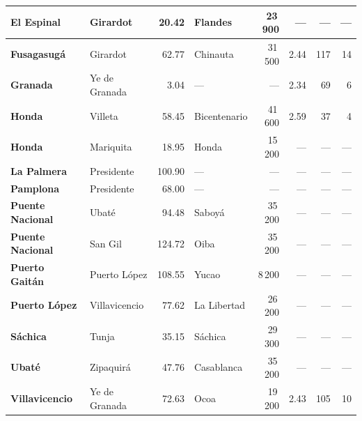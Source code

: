 \begin{longtable}{|l|l|r|l|r|r|r|r|}
\hline
\textbf{El Espinal} & Girardot & 20.42 & Flandes & 23\,900 & --- & --- & --- \\
\hline
\textbf{Fusagasugá} & Girardot & 62.77 & Chinauta & 31\,500 & 2.44 & 117 & 14 \\
\hline
\textbf{Granada} & Ye de Granada & 3.04 & --- & --- & 2.34 & 69 & 6 \\
\hline
\textbf{Honda} & Villeta & 58.45 & Bicentenario & 41\,600 & 2.59 & 37 & 4 \\
\hline
\textbf{Honda} & Mariquita & 18.95 & Honda & 15\,200 & --- & --- & --- \\
\hline
\textbf{La Palmera} & Presidente & 100.90 & --- & --- & --- & --- & --- \\
\hline
\textbf{Pamplona} & Presidente & 68.00 & --- & --- & --- & --- & --- \\
\hline
\textbf{Puente Nacional} & Ubaté & 94.48 & Saboyá & 35\,200 & --- & --- & --- \\
\hline
\textbf{Puente Nacional} & San Gil & 124.72 & Oiba & 35\,200 & --- & --- & --- \\
\hline
\textbf{Puerto Gaitán} & Puerto López & 108.55 & Yucao & 8\,200 & --- & --- & --- \\
\hline
\textbf{Puerto López} & Villavicencio & 77.62 & La Libertad & 26\,200 & --- & --- & --- \\
\hline
\textbf{Sáchica} & Tunja & 35.15 & Sáchica & 29\,300 & --- & --- & --- \\
\hline
\textbf{Ubaté} & Zipaquirá & 47.76 & Casablanca & 35\,200 & --- & --- & --- \\
\hline
\textbf{Villavicencio} & Ye de Granada & 72.63 & Ocoa & 19\,200 & 2.43 & 105 & 10 \\
\hline
\end{longtable}
